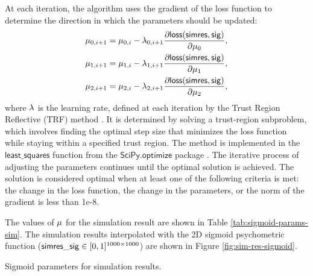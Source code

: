 At each iteration, the algorithm uses the gradient of the loss function to determine the direction in which the parameters should be updated:
\begin{align}
\begin{split}
    \mu_{0, i+1} &= \mu_{0, i} - \lambda_{0, i+1}
    \frac{
        \partial \mathsf{loss}(\mathsf{simres}, \mathsf{sig})
    }{
        \partial {\mu_0}
    }, 
    \\
    \mu_{1, i+1} &= \mu_{1, i} - \lambda_{1, i+1}
    \frac{
        \partial \mathsf{loss}(\mathsf{simres}, \mathsf{sig})
    }{
        \partial {\mu_1}
    }, 
    \\
    \mu_{2, i+1} &= \mu_{2, i} - \lambda_{2, i+1}
    \frac{
        \partial \mathsf{loss}(\mathsf{simres}, \mathsf{sig})
    }{
        \partial {\mu_2}
    }, 
\end{split}
\end{align}
where $\lambda$ is the learning rate, defined at each iteration by the Trust Region Reflective (TRF) method \cite{Branch1999}. It is determined by solving a trust-region subproblem, which involves finding the optimal step size that minimizes the loss function while staying within a specified trust region. The method is implemented in the $\mathsf{least\_squares}$ function from the $\mathsf{SciPy.optimize}$ package \cite{SciPy:least_squares}. The iterative process of adjusting the parameters continues until the optimal solution is achieved. The solution is considered optimal when at least one of the following criteria is met: the change in the loss function, the change in the parameters, or the norm of the gradient is less than 1e-8.

The values of $\mu$ for the simulation result are shown in Table \ref{tab:sigmoid-params-sim}.
The simulation results interpolated with the 2D sigmoid psychometric function ($\mathsf{simres\_sig} \in [0, 1]^{1000 \times 1000}$) are shown in Figure \ref{fig:sim-res-sigmoid}.

\begin{table}[!htp]
    \centering
    
    \caption[Sigmoid parameters for simulation results]{Sigmoid parameters for simulation results.}
    \label{tab:sigmoid-params-sim}
\end{table}
